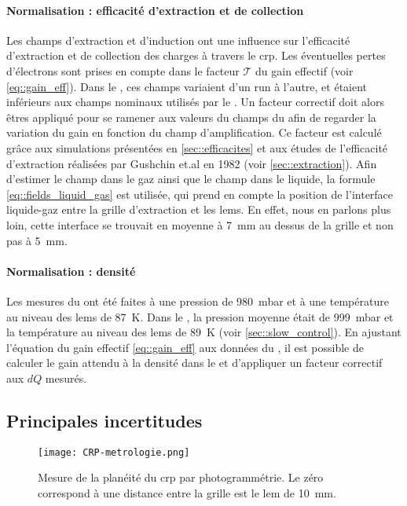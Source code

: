         \paragraph{Normalisation : efficacité d'extraction et de collection} Les champs d'extraction et d'induction ont une influence sur l'efficacité d'extraction et de collection des charges à travers le \gls{crp}. Les éventuelles pertes d'électrons sont prises en compte dans le facteur $\mathcal{T}$ du gain effectif (voir \autoref{eq::gain_eff}). Dans le \TOO{}, ces champs variaient d'un run à l'autre, et étaient inférieurs aux champs nominaux utilisés par le \threeL{}. Un facteur correctif doit alors êtres appliqué pour se ramener aux valeurs du champs du \threeL{} afin de regarder la variation du gain en fonction du champ d'amplification. Ce facteur est calculé grâce aux simulations présentées en \autoref{sec::efficacites} et aux études de l'efficacité d'extraction réalisées par Gushchin et.al en 1982\cite{guschin} (voir \autoref{sec::extraction}). Afin d'estimer le champ dans le gaz ainsi que le champ dans le liquide, la formule \eqref{eq::fields_liquid_gas} est utilisée, qui prend en compte la position de l'interface liquide-gaz entre la grille d'extraction et les \glspl{lem}. En effet, nous en parlons plus loin, cette interface se trouvait en moyenne à \SI{7}{\milli\meter} au dessus de la grille et non pas à \SI{5}{\milli\meter}.

        \paragraph{Normalisation : densité} Les mesures du \threeL{} ont été faites à une pression de \SI{980}{\milli\bar} et à une température au niveau des \glspl{lem} de \SI{87}{\kelvin}. Dans le \TOO{}, la pression moyenne était de \SI{999}{\milli\bar} et la température au niveau des \glspl{lem} de \SI{89}{\kelvin} (voir \autoref{sec::slow_control}). En ajustant l'équation du gain effectif \eqref{eq::gain_eff} aux données du \threeL{}, il est possible de calculer le gain attendu à la densité dans le \TOO{} et d'appliquer un facteur correctif aux $dQ$ mesurés.

    \subsection{Principales incertitudes}\label{sec::uncertainties}
        
      \begin{figure}[htbp]
        \centering
        \texttt{[image: CRP-metrologie.png]}
        \caption[Mesure de la planéité du CRP]{\label{fig::crp_var}Mesure de la planéité du \gls{crp} par photogrammétrie. Le zéro correspond à une distance entre la grille est le \gls{lem} de \SI{10}{\milli\meter}.}
      \end{figure}

